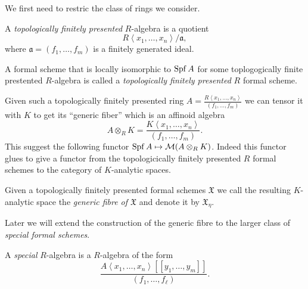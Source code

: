 We first need to restric the class of rings we consider. 

\begin{definition}\label{def:topologically_finite_presentation_algebra}
	A \emph{topologically finitely presented} $R$-algebra is a quotient \[
		R\left<x_1, \ldots, x_n \right> / \mathfrak{a} 
	,\] where $\mathfrak{a}  = (f_1, \ldots, f_m)$ is a finitely generated ideal. 

	A formal scheme that is locally isomorphic to $\operatorname{Spf} A$ for some toplogogically finite prestented $R$-algebra is called a \emph{topologically finitely presented} $R$ formal scheme. 
\end{definition}

Given such a topologically finitely presented ring $A = \frac{R \left<x_1, \ldots, x_n \right>}{(f_1, \ldots, f_m)}$ we can tensor it with $K$ to get its ``generic fiber'' which is an affinoid algebra \[
A \otimes _R K = \frac{K \left<x_1, \ldots, x_n \right>}{(f_1, \ldots, f_m)}
.\]  
This suggest the following functor $\operatorname{Spf} A \mapsto \mathcal{M} (A \otimes_R K)$. 
Indeed this functor glues to give a functor from the topologicically finitely presented $R$ formal schemes to the category of $K$-analytic spaces. 

\begin{definition}\label{def:generic_fibre_of_formal_scheme}
Given a topologically finitely presented formal schemes $\mathfrak{X} $ we call the resulting $K$-analytic space the \emph{generic fibre of  $\mathfrak{X} $} and denote it by $\mathfrak{X} _\eta$. 
\end{definition}

Later we will extend the construction of the generic fibre to the larger class of \emph{special formal schemes}.
\begin{definition}\label{def:special_r_algebra}
	A \emph{special} $R$-algebra is a $R$-algebra of the form \[
		\frac{A\left<x_1, \ldots, x_n \right>[[y_1, \ldots, y_m]]}{(f_1, \ldots, f_\ell)}
	.\] 
\end{definition}



